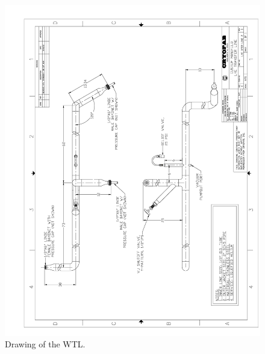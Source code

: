 \begin{appendices}
\begin{figure}[tbp!]
 \centering
 \includegraphics[width=\textwidth]{./img/WTL-drawing.png}
 \caption{Drawing of the WTL.}
 \label{fig:WTL-drawing}
\end{figure}


\end{appendices}
